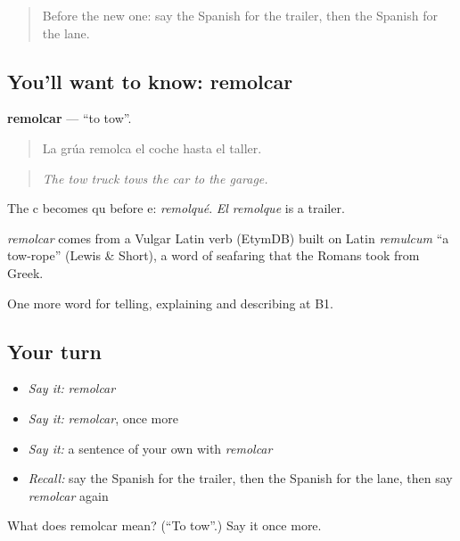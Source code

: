 \label{lesson:ES-C648-remolcar}



\begin{quote}
Before the new one: say the Spanish for the trailer, then the Spanish for the lane.
\end{quote}

\subsection*{You'll want to know: remolcar}
\textbf{remolcar} — \textquotedblleft{}to tow\textquotedblright{}.

\begin{quote}
La grúa remolca el coche hasta el taller.
\end{quote}

\begin{quote}
\emph{The tow truck tows the car to the garage.}
\end{quote}

The c becomes qu before e: \emph{remolqué}. \emph{El remolque} is a trailer.

\begin{cousinweb}
\emph{remolcar} comes from a Vulgar Latin verb (EtymDB) built on Latin \emph{remulcum} \textquotedblleft{}a tow-rope\textquotedblright{} (Lewis \& Short), a word of seafaring that the Romans took from Greek.
\end{cousinweb}

\begin{grammarlens}[title={What you've built}]
One more word for telling, explaining and describing at B1.
\end{grammarlens}

\subsection*{Your turn}
\begin{itemize}
\raggedright
  \item \emph{Say it:} \emph{remolcar}
  \item \emph{Say it:} \emph{remolcar}, once more
  \item \emph{Say it:} a sentence of your own with \emph{remolcar}
  \item \emph{Recall:} say the Spanish for the trailer, then the Spanish for the lane, then say \emph{remolcar} again
\end{itemize}

\begin{tcolorbox}[breakable,colback=teal!4,colframe=teal!35!black,title={Before you move on}]
What does remolcar mean? (\textquotedblleft{}To tow\textquotedblright{}.) Say it once more.
\end{tcolorbox}
